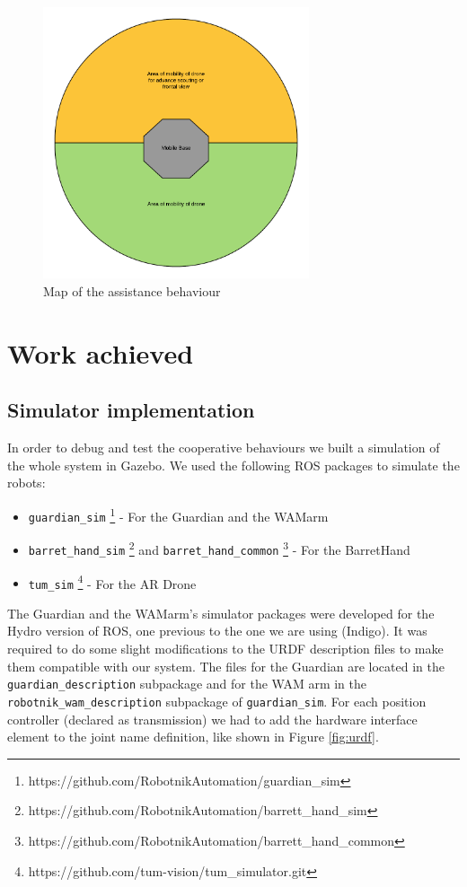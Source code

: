\documentclass[11pt,a4paper]{article}
\begin{document}
\begin{figure}[ht]	
\centering
\includegraphics[height=8cm]{assistanceBehavior.png}
\caption{Map of the assistance behaviour}
\label{fig:assist}
\end{figure}

\clearpage

\section{Work achieved}

\subsection{Simulator implementation}
In order to debug and test the cooperative behaviours we built a simulation of the whole system in Gazebo. 
We used the following ROS packages to simulate the robots:

\begin{itemize}
	\item \verb!guardian_sim! \footnote{https://github.com/RobotnikAutomation/guardian\_sim} - For the Guardian and the WAM\texttrademark arm
	
	\item  \verb!barret_hand_sim!  \footnote{https://github.com/RobotnikAutomation/barrett\_hand\_sim} 
	and \verb!barret_hand_common! \footnote{https://github.com/RobotnikAutomation/barrett\_hand\_common}
	- For the BarretHand\texttrademark
	
	\item  \verb!tum_sim! \footnote{https://github.com/tum-vision/tum\_simulator.git}  - For the AR Drone
\end{itemize}

The Guardian and the WAM\texttrademark arm's simulator packages were developed for the Hydro version of ROS, one previous to the one we are using (Indigo). It was required to do some slight modifications to the URDF description files to make them compatible with our system. The files for the Guardian are located in the \verb!guardian_description! subpackage and for the WAM arm in the \verb!robotnik_wam_description! subpackage of \verb!guardian_sim!. For each position controller (declared as transmission) we had to add the hardware interface element to the joint name definition, like shown in Figure \ref{fig:urdf}.
\end{document}
